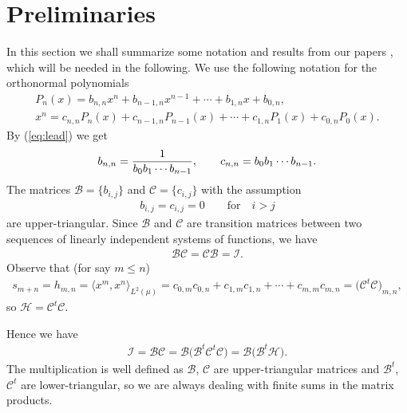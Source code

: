 \section{Preliminaries}\label{section2}
In this section we shall summarize some notation and results from our papers \cite{B:S1,B:S2,B:S3}, which will be needed in the following. We use the following notation for the orthonormal polynomials
\begin{gather}%
P_n(x)=b_{n,n}x^n+b_{n-1,n}x^{n-1}+\cdots + b_{1,n}x+b_{0,n},\nonumber\\
x^n=c_{n,n}P_n(x)+c_{n-1,n}P_{n-1}(x)+\cdots + c_{1,n}P_1(x)+c_{0,n}P_0(x).\label{eq:x}
\end{gather}
By (\ref{eq:lead}) we get
\begin{gather}\label{eq:b_n} b_{n,n}={1\over b_0b_1\cdots b_{n-1}},\qquad c_{n,n}=b_0b_1\cdots b_{n-1}.
\end{gather}
The matrices $\mathcal B=\{b_{i,j}\}$ and $\mathcal C=\{c_{i,j}\}$ with the assumption
\begin{gather*}
b_{i,j}=c_{i,j}=0\qquad \text{for} \quad i>j
\end{gather*}
 are upper-triangular. Since $\mathcal B$ and $\mathcal C$ are transition matrices between two sequences of linearly independent systems of functions, we have
\begin{gather*}
\mathcal B\mathcal C=\mathcal C\mathcal B=\mathcal I.
\end{gather*}
Observe that (for say $m\le n$)
\begin{gather*}s_{m+n} = h_{m,n}=\big\langle x^m,x^n\big\rangle_{L^2(\mu)} = c_{0,m}c_{0,n}+c_{1,m}c_{1,n}+\cdots +c_{m,m}c_{m,n} =\big(\mathcal C^t \mathcal C\big)_{m,n},
\end{gather*}
so $\mathcal{H}=\mathcal C^t \mathcal C$.

Hence we have
\begin{gather}\label{eq:I=B(B^tH)}
\mathcal I=\mathcal B\mathcal C=\mathcal B\big(\mathcal B^t\mathcal C^t\mathcal C\big)=\mathcal B\big(\mathcal B^t\mathcal{H}\big).
\end{gather}
The multiplication is well defined as $\mathcal B$, $\mathcal C$ are upper-triangular matrices and $\mathcal B^t$, $\mathcal C^t$ are lower-triangular, so we are always dealing with finite sums in the matrix products.

